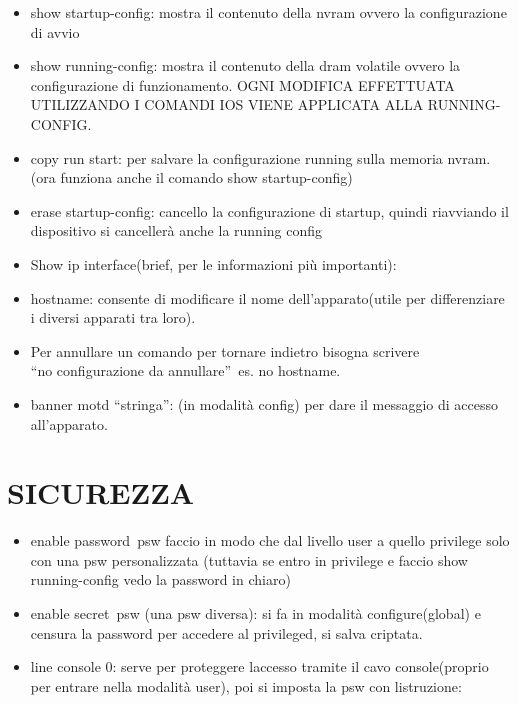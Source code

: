 \documentclass[
]{article}
\providecommand{\tightlist}{%
  \setlength{\itemsep}{0pt}\setlength{\parskip}{0pt}}
\begin{document}
\begin{itemize}
\tightlist
\item
  {show startup-config}{: mostra il contenuto della nvram ovvero la
  configurazione di avvio}
\item
  {show running-config}{: mostra il contenuto della dram volatile ovvero
  la configurazione di funzionamento. OGNI MODIFICA EFFETTUATA
  UTILIZZANDO I COMANDI IOS VIENE APPLICATA ALLA RUNNING-CONFIG.}
\item
  {copy run start}{: per salvare la configurazione running sulla memoria
  nvram.(ora funziona anche il comando show startup-config)}
\item
  {erase startup-config}{: cancello la configurazione di startup, quindi
  riavviando il dispositivo si cancellerà anche la running config}
\item
  {Show ip interface}{(brief, per le informazioni più importanti): ~}
\item
  {hostname}{: consente di modificare il nome dell'apparato(utile per
  differenziare i diversi apparati tra loro).}
\item
  {Per annullare un comando per tornare indietro bisogna scrivere\\
  }{``no }{configurazione da annullare}{''}{~es. no hostname.}
\item
  {banner motd ``stringa}{''}{: (in modalità config) per dare il
  messaggio di accesso all'apparato.}
\end{itemize}

{}

{}

\subsubsection{\texorpdfstring{{}}{}}\label{h.30j0zll}

\section{\texorpdfstring{{SICUREZZA}}{SICUREZZA}}\label{h.1fob9te}

\begin{itemize}
\tightlist
\item
  {enable password}{~psw faccio in modo che dal livello user a quello
  privilege solo con una psw personalizzata (tuttavia se entro in
  privilege e faccio show running-config vedo la password in chiaro)}
\item
  {enable secret}{~}{psw (una psw diversa): si fa in modalità
  configure(global) e censura la password per accedere al privileged, si
  salva criptata.}
\item
  {line console 0}{: serve per proteggere l\textquotesingle accesso
  tramite il cavo console(proprio per entrare nella modalità user), poi
  si imposta la psw con l\textquotesingle istruzione: }
\end{itemize}
\end{document}
